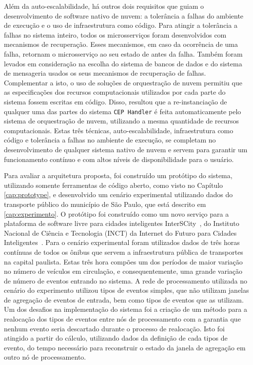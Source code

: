 Além da auto-escalabilidade, há outros dois requisitos que guiam o desenvolvimento de software nativo de nuvem: a tolerância a falhas do ambiente de execução e o uso de infraestrutura como código. Para atingir a tolerância a falhas no sistema inteiro, todos os microsserviços foram desenvolvidos com mecanismos de recuperação. Esses mecanismos, em caso da ocorrência de uma falha, retornam o microsserviço ao seu estado de antes da falha. Também foram levados em consideração na escolha do sistema de bancos de dados e do sistema de mensageria usados os seus mecanismos de recuperação de falhas. Complementar a isto, o uso de soluções de orquestração de nuvem permitiu que as especificações dos recursos computacionais utilizados por cada parte do sistema fossem escritas em código. Disso, resultou que a re-instanciação de qualquer uma das partes do sistema \texttt{CEP Handler} é feita automaticamente pelo sistema de orquestração de nuvem, utilizando a mesma quantidade de recursos computacionais. Estas três técnicas, auto-escalabilidade, infraestrutura como código e tolerância a falhas no ambiente de execução, se completam no desenvolvimento de qualquer sistema nativo de nuvem e servem para garantir um funcionamento contínuo e com altos níveis de disponibilidade para o usuário. 

Para avaliar a arquitetura proposta, foi construído um protótipo do sistema, utilizando somente ferramentas de código aberto, como visto no Capítulo \ref{cap:prototype}, e desenvolvido um cenário experimental utilizando dados do transporte público do município de São Paulo, que está descrito em \autoref{cap:experimento}. O protótipo foi construído como um novo serviço para a plataforma de software livre para cidades inteligentes InterSCity~\citep{del2019design}, do Instituto Nacional de Ciência e Tecnologia (INCT) da Internet do Futuro para Cidades Inteligentes~\citep{Interscitysite}. Para o cenário experimental foram utilizados dados de três horas contínuas de todos os ônibus que servem a infraestrutura pública de transportes na capital paulista. Estas três hora compões um dos períodos de maior variação no número de veículos em circulação, e consequentemente, uma grande variação de número de eventos entrando no sistema. A rede de processamento utilizada no cenário do experimento utilizou tipos de eventos simples, que não utilizam janelas de agregação de eventos de entrada, bem como tipos de eventos que as utilizam. Um dos desafios na implementação do sistema foi a criação de um método para a realocação dos tipos de eventos entre nós de processamento com a garantia que nenhum evento seria descartado durante o processo de realocação. Isto foi atingido a partir do cálculo, utilizando dados da definição de cada tipos de evento, do tempo necessário para reconstruir o estado da janela de agregação em outro nó de processamento.


